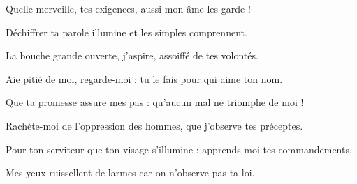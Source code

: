 \item Quelle merveille, tes exigences, aussi mon âme les garde !

\item Déchiffrer ta parole illumine et les simples comprennent.

\item La bouche grande ouverte, j'aspire, assoiffé de tes volontés.

\item Aie pitié de moi, regarde-moi : tu le fais pour qui aime ton nom.

\item Que ta promesse assure mes pas : qu'aucun mal ne triomphe de moi !

\item Rachète-moi de l'oppression des hommes, que j'observe tes préceptes.

\item Pour ton serviteur que ton visage s'illumine : apprends-moi tes commandements.

\item Mes yeux ruissellent de larmes car on n'observe pas ta loi.
